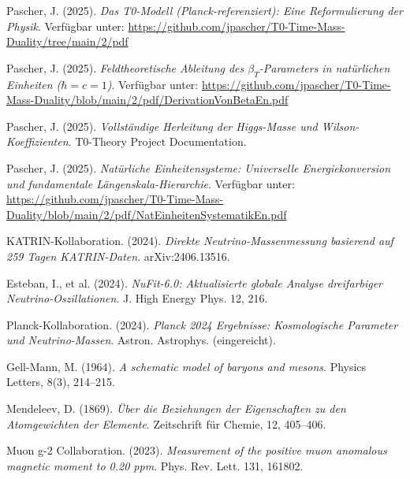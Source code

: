 \documentclass[12pt,a4paper]{article}
\begin{document}
	\newpage
	\begin{thebibliography}{99}
		Pascher, J. (2025). \textit{Das T0-Modell (Planck-referenziert): Eine Reformulierung der Physik}. Verfügbar unter: \url{https://github.com/jpascher/T0-Time-Mass-Duality/tree/main/2/pdf}
		
		Pascher, J. (2025). \textit{Feldtheoretische Ableitung des $\beta_T$-Parameters in natürlichen Einheiten ($\hbar = c = 1$)}. Verfügbar unter: \url{https://github.com/jpascher/T0-Time-Mass-Duality/blob/main/2/pdf/DerivationVonBetaEn.pdf}
		
		Pascher, J. (2025). \textit{Vollständige Herleitung der Higgs-Masse und Wilson-Koeffizienten}. T0-Theory Project Documentation.
		
		Pascher, J. (2025). \textit{Natürliche Einheitensysteme: Universelle Energiekonversion und fundamentale Längenskala-Hierarchie}. Verfügbar unter: \url{https://github.com/jpascher/T0-Time-Mass-Duality/blob/main/2/pdf/NatEinheitenSystematikEn.pdf}
		
		KATRIN-Kollaboration. (2024). \textit{Direkte Neutrino-Massenmessung basierend auf 259 Tagen KATRIN-Daten}. arXiv:2406.13516.
		
		Esteban, I., et al. (2024). \textit{NuFit-6.0: Aktualisierte globale Analyse dreifarbiger Neutrino-Oszillationen}. J. High Energy Phys. 12, 216.
		
		Planck-Kollaboration. (2024). \textit{Planck 2024 Ergebnisse: Kosmologische Parameter und Neutrino-Massen}. Astron. Astrophys. (eingereicht).
		
		Gell-Mann, M. (1964). \textit{A schematic model of baryons and mesons}. Physics Letters, 8(3), 214--215.
		
		Mendeleev, D. (1869). \textit{Über die Beziehungen der Eigenschaften zu den Atomgewichten der Elemente}. Zeitschrift für Chemie, 12, 405--406.
		
		Muon g-2 Collaboration. (2023). \textit{Measurement of the positive muon anomalous magnetic moment to 0.20 ppm}. Phys. Rev. Lett. 131, 161802.
		
	\end{thebibliography}
	
\end{document}

